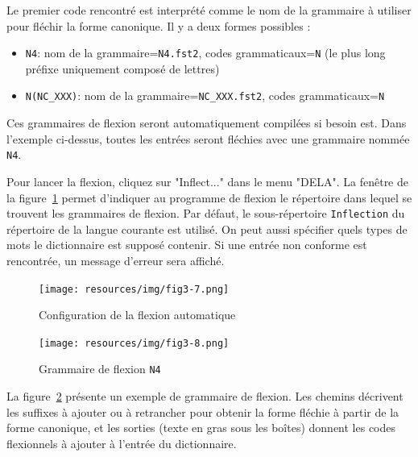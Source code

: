 \bigskip
\noindent Le premier code rencontré est interprété comme le nom de la grammaire à utiliser pour
fléchir la forme canonique. Il y a deux formes possibles :

\begin{itemize}
\item \verb+N4+: nom de la grammaire=\verb+N4.fst2+, codes grammaticaux=\verb+N+
	(le plus long préfixe uniquement composé de lettres)
  \item \verb+N(NC_XXX)+: nom de la grammaire=\verb+NC_XXX.fst2+, codes grammaticaux=\verb+N+
\end{itemize}

\bigskip
\noindent Ces grammaires de flexion
seront automatiquement compilées si
besoin est. Dans l’exemple ci-dessus, toutes les entrées seront fléchies avec une grammaire nommée
\verb+N4+.

\bigskip
\noindent Pour lancer la flexion, cliquez sur "Inflect..." dans le menu "DELA". La fenêtre de la 
figure~\ref{fig-inflection-configuration} permet d’indiquer au programme de flexion le
répertoire dans lequel se trouvent les grammaires de flexion. Par défaut, le sous-répertoire
\verb+Inflection+ du répertoire de la langue courante est utilisé. On peut aussi spécifier quels
types de mots le dictionnaire est supposé contenir. Si une entrée non conforme est
rencontrée, un message d'erreur sera affiché.

\bigskip
\begin{figure}[!ht]
\begin{center}
\texttt{[image: resources/img/fig3-7.png]}
\caption{Configuration de la flexion automatique\label{fig-inflection-configuration}}
\end{center}
\end{figure}

\bigskip
\begin{figure}[!ht]
\begin{center}
\texttt{[image: resources/img/fig3-8.png]}
\caption{Grammaire de flexion
\texttt{N4}\label{fig-example-inflectional-grammar}}
\end{center}
\end{figure}

\bigskip
\noindent La figure~\ref{fig-example-inflectional-grammar} présente un exemple de grammaire de
flexion. Les chemins décrivent les suffixes à ajouter ou à retrancher pour obtenir la forme fléchie
à partir de la forme canonique, et les sorties (texte en gras sous les boîtes) donnent les codes
flexionnels à ajouter à l’entrée du dictionnaire.


